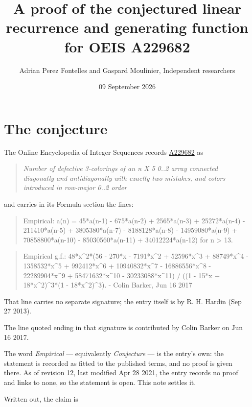 \documentclass[11pt]{article}
\title{A proof of the conjectured linear recurrence and generating function for OEIS A229682}
\author{Adrian Perez Fontelles and Gaspard Moulinier, Independent researchers}
\date{09 September 2026}
\theoremstyle{definition}
\begin{document}
\maketitle
\section{The conjecture}

The Online Encyclopedia of Integer Sequences records \href{https://oeis.org/A229682}{A229682} as

\begin{quote}\itshape Number of defective 3-colorings of an n X 5 0..2 array connected diagonally and antidiagonally with exactly two mistakes, and colors introduced in row-major 0..2 order\end{quote}

and carries in its Formula section the lines:

\begin{quote}\ttfamily Empirical: a(n) = 45*a(n-1) - 675*a(n-2) + 2565*a(n-3) + 25272*a(n-4) - 211410*a(n-5) + 3805380*a(n-7) - 8188128*a(n-8) - 14959080*a(n-9) + 70858800*a(n-10) - 85030560*a(n-11) + 34012224*a(n-12) for n > 13.\end{quote}

\begin{quote}\ttfamily Empirical g.f.: 48*x\textasciicircum{}2*(56 - 270*x - 7191*x\textasciicircum{}2 + 52596*x\textasciicircum{}3 + 88749*x\textasciicircum{}4 - 1358532*x\textasciicircum{}5 + 992412*x\textasciicircum{}6 + 10940832*x\textasciicircum{}7 - 16886556*x\textasciicircum{}8 - 22289904*x\textasciicircum{}9 + 58471632*x\textasciicircum{}10 - 30233088*x\textasciicircum{}11) / ((1 - 15*x + 18*x\textasciicircum{}2)\textasciicircum{}3*(1 - 18*x\textasciicircum{}2)\textasciicircum{}3). - Colin Barker, Jun 16 2017\end{quote}

That line carries no separate signature; the entry itself is by R. H. Hardin (Sep 27 2013).

The line quoted ending in that signature is contributed by Colin Barker on Jun 16 2017.

The word {\itshape Empirical} --- equivalently {\itshape Conjecture} --- is the entry's own: the statement is recorded as fitted to the published terms, and no proof is given there. As of revision 12, last modified Apr 28 2021, the entry records no proof and links to none, so the statement is open. This note settles it.

Written out, the claim is
\end{document}
